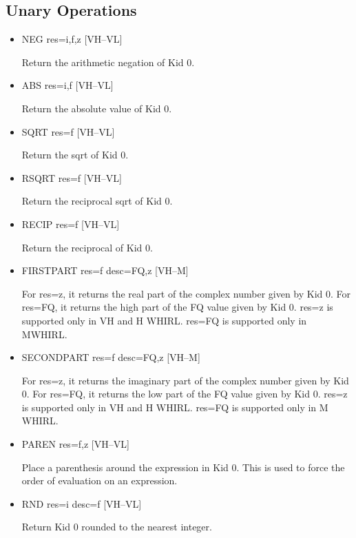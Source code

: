 \documentclass{article}
\begin{document}
\subsection{Unary Operations}
\begin{itemize}

\item
{}%
NEG res=i,f,z \hfill [VH--VL]

Return the arithmetic negation of Kid 0.

%
\item  ABS res=i,f \hfill [VH--VL]

Return the absolute value of Kid 0.

\item
{}%
SQRT res=f \hfill [VH--VL]

Return the sqrt of Kid 0.

\item
{}%
RSQRT res=f \hfill [VH--VL]

Return the reciprocal sqrt of Kid 0.

\item
{}%
RECIP res=f \hfill [VH--VL]

Return the reciprocal of Kid 0.

\item
{}%
FIRSTPART res=f desc=FQ,z \hfill [VH--M]

For res=z, it returns the real part of the complex number given by
Kid 0. For res=FQ, it returns the high part of the FQ value given
by Kid 0. res=z
is supported only in VH and H WHIRL. res=FQ is supported only in
MWHIRL.

%
\item  SECONDPART res=f desc=FQ,z \hfill [VH--M]

For res=z, it returns the imaginary part of the complex number
given by Kid 0. For res=FQ, it returns the low part of the FQ value
given by Kid 0.  res=z is supported only in VH and H WHIRL. res=FQ is supported
only in M WHIRL.

\item
{}%
PAREN res=f,z \hfill [VH--VL]

Place a parenthesis around the expression in Kid 0. This is used
to force the order of evaluation on an expression.

\item
{}%
RND res=i desc=f \hfill [VH--VL]

Return Kid 0 rounded to the nearest integer.


\end{itemize}
\end{document}
